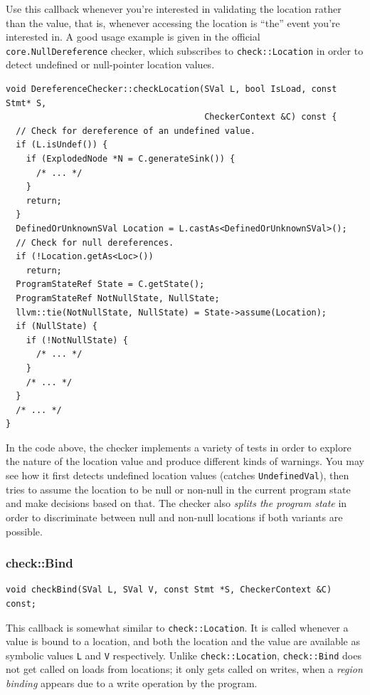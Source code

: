 \documentclass[a4paper,12pt]{article}
\newenvironment{nobr}{\begin{minipage}{\textwidth}\setlength\parskip{1em}
}{\end{minipage}\ignorespacesafterend}
\begin{document}
Use this callback whenever you're interested in validating the location rather than the value, that is, whenever accessing the location is ``the'' event you're interested in. A good usage example is given in the official \lstinline|core.NullDereference| checker, which subscribes to \lstinline|check::Location| in order to detect undefined or null-pointer location values.

\begin{nobr}
\begin{lstlisting}[style=cplusplus]
void DereferenceChecker::checkLocation(SVal L, bool IsLoad, const Stmt* S,
                                       CheckerContext &C) const {
  // Check for dereference of an undefined value.
  if (L.isUndef()) {
    if (ExplodedNode *N = C.generateSink()) {
      /* ... */
    }
    return;
  }
  DefinedOrUnknownSVal Location = L.castAs<DefinedOrUnknownSVal>();
  // Check for null dereferences.
  if (!Location.getAs<Loc>())
    return;
  ProgramStateRef State = C.getState();
  ProgramStateRef NotNullState, NullState;
  llvm::tie(NotNullState, NullState) = State->assume(Location);
  if (NullState) {
    if (!NotNullState) {
      /* ... */
    }
    /* ... */
  }
  /* ... */
}
\end{lstlisting}
\end{nobr}

In the code above, the checker implements a variety of tests in order to explore the nature of the location value and produce different kinds of warnings. You may see how it first detects undefined location values (catches \lstinline|UndefinedVal|), then tries to assume the location to be null or non-null in the current program state and make decisions based on that. The checker also \emph{splits the program state} in order to discriminate between null and non-null locations if both variants are possible.

\begin{nobr}
\subsubsection{check::Bind}

\begin{lstlisting}[style=cplusplus,numbers=none]
void checkBind(SVal L, SVal V, const Stmt *S, CheckerContext &C) const;
\end{lstlisting}

This callback is somewhat similar to \lstinline|check::Location|. It is called whenever a value is bound to a location, and both the location and the value are available as symbolic values \lstinline|L| and \lstinline|V| respectively. Unlike \lstinline|check::Location|, \lstinline|check::Bind| does not get called on loads from locations; it only gets called on writes, when a \emph{region binding} appears due to a write operation by the program.
\end{nobr}
\end{document}
